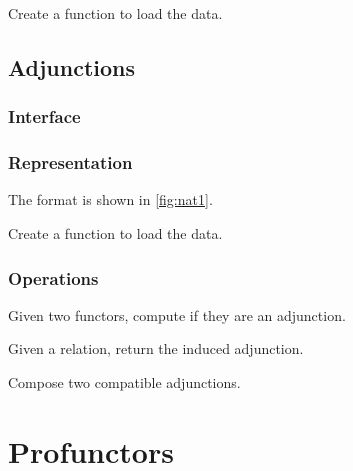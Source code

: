 \begin{exercise}
  Create a function to load the data.

%
\end{exercise}


\section{Adjunctions}

\subsection*{Interface}

\subsection*{Representation}

The format is shown in \cref{fig:nat1}.



\begin{exercise}
  Create a function to load the data.

%
\end{exercise}

\subsection{Operations}
\begin{exercise}
  Given two functors, compute if they are an adjunction.

\end{exercise}

\begin{exercise}
  Given a relation, return the induced adjunction.
\end{exercise}


\begin{exercise}
  Compose two compatible adjunctions.
\end{exercise}


\chapter{Profunctors}


